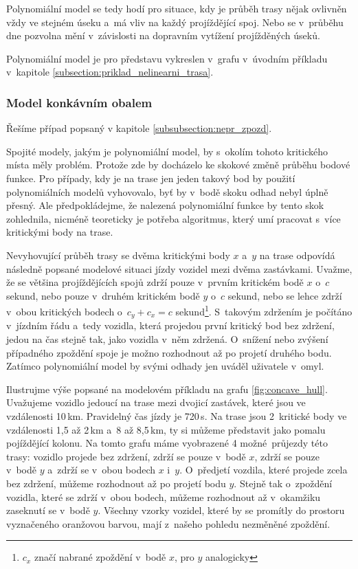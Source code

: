 Polynomiální model se tedy hodí pro situace, kdy je průběh trasy nějak ovlivněn vždy ve stejném úseku a~má vliv na každý projíždějící spoj. Nebo se v~průběhu dne pozvolna mění v~závislosti na dopravním vytížení projížděných úseků.

\bigbreak


Polynomiální model je pro představu vykreslen v~grafu v~úvodním příkladu v~kapitole \ref{subsection:priklad_nelinearni_trasa}.



\subsubsection{Model konkávním obalem}

Řešíme případ popsaný v kapitole \ref{subsubsection:nepr_zpozd}.

\bigbreak

Spojité modely, jakým je polynomiální model, by s~okolím tohoto kritického místa měly problém. Protože zde by docházelo ke skokové změně průběhu bodové funkce. Pro případy, kdy je na trase jen jeden takový bod by použití polynomiálních modelů vyhovovalo, byť by v~bodě skoku odhad nebyl úplně přesný. Ale předpokládejme, že nalezená polynomiální funkce by tento skok zohlednila, nicméně teoreticky je potřeba algoritmus, který umí pracovat s~více kritickými body na trase.


\bigbreak

Nevyhovující průběh trasy se dvěma kritickými body $x$ a~$y$ na trase odpovídá následně popsané modelové situaci jízdy vozidel mezi dvěma zastávkami. Uvažme, že se většina projíždějících spojů zdrží pouze v~prvním kritickém bodě $x$ o~$c$ sekund, nebo pouze v~druhém kritickém bodě $y$ o~$c$ sekund, nebo se lehce zdrží v~obou kritických bodech o~$c_y + c_x = c$ sekund\footnote{$c_x$ značí nabrané zpoždění v~bodě $x$, pro $y$ analogicky}. S~takovým zdržením je počítáno v~jízdním řádu a~tedy vozidla, která projedou první kritický bod bez zdržení, jedou na čas stejně tak, jako vozidla v~něm zdržená. O~snížení nebo zvýšení případného zpoždění spoje je možno rozhodnout až po projetí druhého bodu. Zatímco polynomiální model by svými odhady jen uváděl uživatele v~omyl.


\bigbreak

Ilustrujme výše popsané na modelovém příkladu na grafu \ref{fig:concave_hull}. Uvažujeme vozidlo jedoucí na trase mezi dvojicí zastávek, které jsou ve vzdálenosti 10\,km. Pravidelný čas jízdy je 720\,s. Na trase jsou 2~kritické body ve vzdálenosti 1,5 až 2\,km a~8 až 8,5\,km, ty si můžeme představit jako pomalu pojíždějící kolonu. Na tomto grafu máme vyobrazené 4 možné průjezdy této trasy: vozidlo projede bez zdržení, zdrží se pouze v~bodě $x$, zdrží se pouze v~bodě $y$ a~zdrží se v~obou bodech $x$ i~$y$. O~předjetí vozdila, které projede zcela bez zdržení, můžeme rozhodnout až po projetí bodu $y$. Stejně tak o~zpoždění vozidla, které se zdrží v~obou bodech, můžeme rozhodnout až v~okamžiku zaseknutí se v~bodě $y$. Všechny vzorky vozidel, které by se promítly do prostoru vyznačeného oranžovou barvou, mají z~našeho pohledu nezměněné zpoždění.


